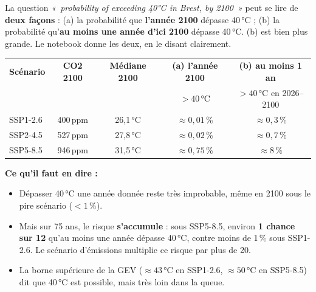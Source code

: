 \documentclass[11pt,a4paper]{article}
\newcommand{\en}[1]{\textit{«~#1~»}}
\begin{document}
\begin{attention}
La question \en{probability of exceeding 40°C in Brest, by 2100} peut se lire de \textbf{deux façons} : (a) la probabilité que \textbf{l'année 2100} dépasse 40\,°C ; (b) la probabilité qu'\textbf{au moins une année d'ici 2100} dépasse 40\,°C. (b) est bien plus grande. Le notebook donne les deux, en le disant clairement.
\end{attention}

\begin{center}
\begin{tabular}{@{}lcccc@{}}
\toprule
\textbf{Scénario} & \textbf{CO2 2100} & \textbf{Médiane 2100} & \textbf{(a) l'année 2100} & \textbf{(b) au moins 1 an} \\
 & & & \small $>40$\,°C & \small $>40$\,°C en 2026--2100 \\
\midrule
SSP1-2.6 & 400\,ppm & 26,1\,°C & $\approx 0{,}01$\,\% & $\approx 0{,}3$\,\% \\
SSP2-4.5 & 527\,ppm & 27,8\,°C & $\approx 0{,}02$\,\% & $\approx 0{,}7$\,\% \\
SSP5-8.5 & 946\,ppm & 31,5\,°C & $\approx 0{,}75$\,\% & $\approx 8$\,\% \\
\bottomrule
\end{tabular}
\end{center}

\textbf{Ce qu'il faut en dire :}
\begin{itemize}
  \item Dépasser 40\,°C une année donnée reste très improbable, même en 2100 sous le pire scénario ($<1$\,\%).
  \item Mais sur 75 ans, le risque \textbf{s'accumule} : sous SSP5-8.5, environ \textbf{1 chance sur 12} qu'au moins une année dépasse 40\,°C, contre moins de 1\,\% sous SSP1-2.6. Le scénario d'émissions multiplie ce risque par plus de 20.
  \item La borne supérieure de la GEV ($\approx 43$\,°C en SSP1-2.6, $\approx 50$\,°C en SSP5-8.5) dit que 40\,°C est possible, mais très loin dans la queue.
\end{itemize}
\end{document}
